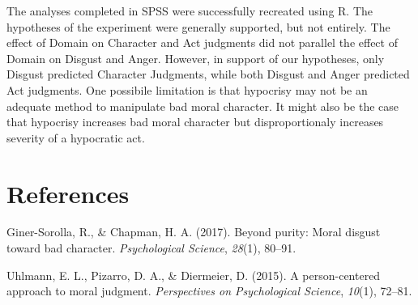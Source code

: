 \documentclass[man]{apa6}
\begin{document}
The analyses completed in SPSS were successfully recreated using R. The
hypotheses of the experiment were generally supported, but not entirely.
The effect of Domain on Character and Act judgments did not parallel the
effect of Domain on Disgust and Anger. However, in support of our
hypotheses, only Disgust predicted Character Judgments, while both
Disgust and Anger predicted Act judgments. One possibile limitation is
that hypocrisy may not be an adequate method to manipulate bad moral
character. It might also be the case that hypocrisy increases bad moral
character but disproportionaly increases severity of a hypocratic act.

\newpage

\section{References}\label{references}

\begingroup
\setlength{\parindent}{-0.5in} \setlength{\leftskip}{0.5in}

\hypertarget{refs}{}
\hypertarget{ref-giner2017beyond}{}
Giner-Sorolla, R., \& Chapman, H. A. (2017). Beyond purity: Moral
disgust toward bad character. \emph{Psychological Science},
\emph{28}(1), 80--91.

\hypertarget{ref-uhlmann2015person}{}
Uhlmann, E. L., Pizarro, D. A., \& Diermeier, D. (2015). A
person-centered approach to moral judgment. \emph{Perspectives on
Psychological Science}, \emph{10}(1), 72--81.

\endgroup
\end{document}
